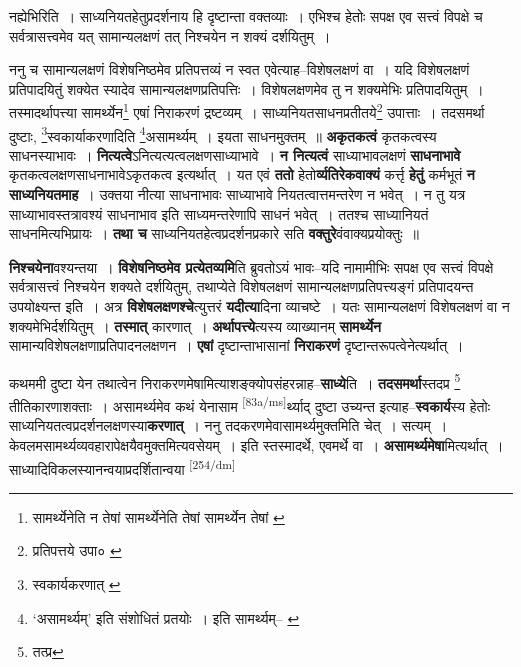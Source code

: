 \documentclass[article,12pt,a4paper]{memoir}
\begin{document}
	नह्येभिरिति । साध्यनियतहेतुप्रदर्शनाय हि दृष्टान्ता वक्तव्याः । एभिश्च हेतोः सपक्ष एव सत्त्वं विपक्षे च सर्वत्रासत्त्वमेव यत् सामान्यलक्षणं तत् निश्चयेन न शक्यं दर्शयितुम् । 
	  
	ननु च सामान्यलक्षणं विशेषनिष्ठमेव प्रतिपत्तव्यं न स्वत एवेत्याह--विशेषलक्षणं वा । यदि विशेषलक्षणं प्रतिपादयितुं शक्येत स्यादेव सामान्यलक्षणप्रतिपत्तिः । विशेषलक्षणमेव तु न शक्यमेभिः प्रतिपादयितुम् । तस्मादर्थापत्त्या सामर्थ्येन\footnote{सामर्थ्येनेति न तेषां \cite{dp-msA} \cite{dp-msB} \cite{dp-edP} सामर्थ्येनेति तेषां \cite{dp-edE} \cite{dp-edH} सामर्थ्येन तेषां \cite{dp-msD}} एषां निराकरणं द्रष्टव्यम् । साध्यनियतसाधनप्रतीतये\footnote{प्रतिपत्तये उपा० \cite{dp-msB}} उपात्ताः । तदसमर्था दुष्टाः, \footnote{स्वकार्यकरणात् \cite{dp-msA} \cite{dp-msB} \cite{dp-edP} \cite{dp-edH}}स्वकार्याकरणादिति \footnote{‘असामर्थ्यम्’ इति संशोधितं \cite{dp-msC} \cite{dp-msD} प्रतयोः । इति सामर्थ्यम्--\cite{dp-msA} \cite{dp-msB} \cite{dp-edP} \cite{dp-edH} \cite{dp-edE} \cite{dp-edN}}असामर्थ्यम् । इयता साधनमुक्तम् ॥ \textbf{अकृतकत्वं} कृतकत्वस्य साधनस्याभावः । \textbf{नित्यत्वे}ऽनित्यत्यत्वलक्षणसाध्याभावे । \textbf{न नित्यत्वं} साध्याभावलक्षणं \textbf{साधनाभावे} कृतकत्वलक्षणसाधनाभावेऽकृतकत्व इत्यर्थात् । यत एवं \textbf{ततो} हेतो\textbf{र्व्यतिरेकवाक्यं} कर्त्तृ \textbf{हेतुं} कर्मभूतं \textbf{न साध्यनियतमाह} । उक्तया नीत्या साधनाभावः साध्याभावे नियतत्वात्तमन्तरेण न भवेत् । न तु यत्र साध्याभावस्तत्रावश्यं साधनाभाव इति साध्यमन्तरेणापि साधनं भवेत् । ततश्च साध्यानियतं साधनमित्यभिप्रायः । \textbf{तथा च} साध्यनियतहेत्वप्रदर्शनप्रकारे सति \textbf{वक्तुरे}वंवाक्यप्रयोक्तुः ॥
	\pend
      

	  \pstart \textbf{निश्चयेना}वश्यन्तया । \textbf{विशेषनिष्ठमेव प्रत्येतव्यमि}ति ब्रुवतोऽयं भावः--यदि नामामीभिः सपक्ष एव सत्त्वं विपक्षे सर्वत्रासत्त्वं निश्चयेन शक्यते दर्शयितुम्, तथाप्येते विशेषलक्षणं सामान्यलक्षणप्रतिपत्त्यङ्गं प्रतिपादयन्त उपयोक्ष्यन्त इति । अत्र \textbf{विशेषलक्षणश्चे}त्युत्तरं \textbf{यदीत्या}दिना व्याचष्टे । यतः सामान्यलक्षणं विशेषलक्षणं वा न शक्यमेभिर्दर्शयितुम् । \textbf{तस्मात्} कारणात् । \textbf{अर्थापत्त्ये}त्यस्य व्याख्यानम् \textbf{सामर्थ्येन} सामान्यविशेषलक्षणाप्रतिपादनलक्षणन । \textbf{एषां} दृष्टान्ताभासानां \textbf{निराकरणं} दृष्टान्तरूपत्वेनेत्यर्थात् ।
	\pend
      

	  \pstart कथममी दुष्टा येन तथात्वेन निराकरणमेषामित्याशङ्क्योपसंहरन्नाह--\textbf{साध्ये}ति । \textbf{तदसमर्था}स्तदप्र \footnote{तत्प्र} तीतिकारणाशक्ताः । असामर्थ्यमेव कथं येनासाम \leavevmode\textsuperscript{\rmlatinfont\tiny [83a/ms]}र्थ्याद् दुष्टा उच्यन्त इत्याह--\textbf{स्वकार्य}स्य हेतोः साध्यनियतत्वप्रदर्शनलक्षणस्या\textbf{करणात्} । ननु तदकरणमेवासामर्थ्यमुक्तमिति चेत् । सत्यम् । केवलमसामर्थ्यव्यवहारापेक्षयैवमुक्तमित्यवसेयम् । इति स्तस्मादर्थे, एवमर्थे वा । \textbf{असामर्थ्यमेषा}मित्यर्थात् । साध्यादिविकलस्यानन्वयाप्रदर्शितान्वया    \leavevmode\textsuperscript{\rmlatinfont\tiny [254/dm]} 
	  
\end{document}
